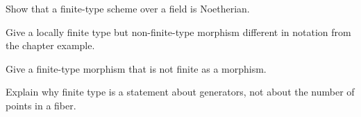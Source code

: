 \begin{exercise}\label{exr:vi26-23}Show that a finite-type scheme over a field is Noetherian.\end{exercise}

\begin{exercise}\label{exr:vi26-24}Give a locally finite type but non-finite-type morphism different in notation from the chapter example.\end{exercise}

\begin{exercise}\label{exr:vi26-25}Give a finite-type morphism that is not finite as a morphism.\end{exercise}

\begin{exercise}\label{exr:vi26-26}Explain why finite type is a statement about generators, not about the number of points in a fiber.\end{exercise}
